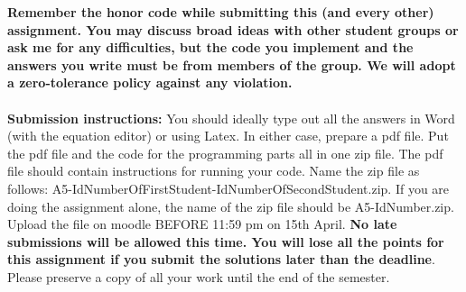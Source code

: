 \documentclass[11pt]{article}
\begin{document}
\maketitle

\textbf{Remember the honor code while submitting this (and every other) assignment. You may discuss broad ideas with other student groups or ask me for any difficulties, but the code you implement and the answers you write must be from members of the group. We will adopt a \textbf{zero-tolerance policy} against any violation.}
\\
\\
\textbf{Submission instructions:} You should ideally type out all the answers in Word (with the equation editor) or using Latex. In either case, prepare a pdf file. Put the pdf file and the code for the programming parts all in one zip file. The pdf file should contain instructions for running your code. Name the zip file as follows: A5-IdNumberOfFirstStudent-IdNumberOfSecondStudent.zip. If you are doing the assignment alone, the name of the zip file should be A5-IdNumber.zip. Upload the file on moodle BEFORE 11:59 pm on 15th April. \textbf{No late submissions will be allowed this time. You will lose all the points for this assignment if you submit the solutions later than the deadline}. Please preserve a copy of all your work until the end of the semester. 
\end{document}
